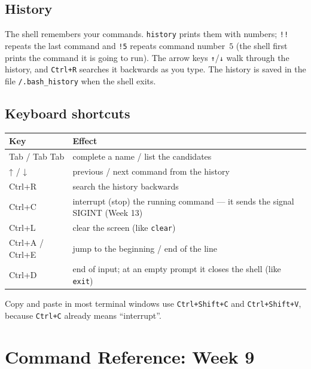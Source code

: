 \documentclass[11pt,a4paper]{article}
\newcommand{\cmd}[1]{\texttt{#1}}
\begin{document}
\subsection{History}


The shell remembers your commands. \cmd{history} prints them with numbers; \cmd{!!} repeats the last command and \cmd{!5} repeats command number~$5$ (the shell first prints the command it is going to run). The arrow keys \texttt{↑}/\texttt{↓} walk through the history, and \texttt{Ctrl+R} searches it backwards as you type. The history is saved in the file \texttt{\tl/.bash\_history} when the shell exits.

\subsection{Keyboard shortcuts}

\begin{center}
\begin{tabular}{>{\ttfamily}l l}
\toprule
\normalfont\textbf{Key} & \textbf{Effect}\\
\midrule
Tab / Tab Tab & complete a name / list the candidates\\
↑ / ↓ & previous / next command from the history\\
Ctrl+R & search the history backwards\\
Ctrl+C & interrupt (stop) the running command --- it sends the signal SIGINT (Week 13)\\
Ctrl+L & clear the screen (like \cmd{clear})\\
Ctrl+A / Ctrl+E & jump to the beginning / end of the line\\
Ctrl+D & end of input; at an empty prompt it closes the shell (like \cmd{exit})\\
\bottomrule
\end{tabular}
\end{center}
Copy and paste in most terminal windows use \texttt{Ctrl+Shift+C} and \texttt{Ctrl+Shift+V}, because \texttt{Ctrl+C} already means ``interrupt''.

\section{Command Reference: Week 9}
\end{document}
